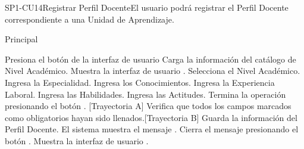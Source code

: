 \begin{UseCase}{SP1-CU14}{Registrar Perfil Docente}{El usuario podrá registrar el Perfil Docente correspondiente a una Unidad de Aprendizaje.}
\end{UseCase}

\begin{UCtrayectoria}{Principal}

    \UCpaso[\UCactor] Presiona el botón  de la interfaz de usuario 
    \UCpaso Carga la información del catálogo de Nivel Académico.
    \UCpaso Muestra la interfaz de usuario .
    \UCpaso[\UCactor] Selecciona el Nivel Académico.
    \UCpaso[\UCactor] Ingresa la Especialidad.
    \UCpaso[\UCactor] Ingresa los Conocimientos.
    \UCpaso[\UCactor] Ingresa la Experiencia Laboral.
    \UCpaso[\UCactor] Ingresa las Habilidades.
    \UCpaso[\UCactor] Ingresa las Actitudes.
    \UCpaso[\UCactor] Termina la operación presionando el botón . [Trayectoria A]
    \UCpaso Verifica que todos los campos marcados como obligatorios hayan sido llenados.[Trayectoria B]
    \UCpaso Guarda la información del Perfil Docente.
    \UCpaso El sistema muestra el mensaje .
    \UCpaso[\UCactor] Cierra el mensaje presionando el botón .
    \UCpaso Muestra la interfaz de usuario .
\end{UCtrayectoria}

